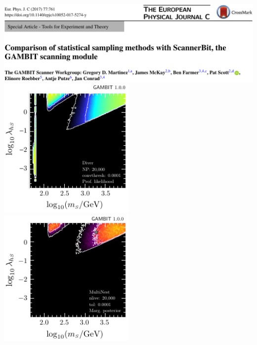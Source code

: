 \documentclass[aspectratio=169]{beamer}
\begin{document}
\begin{frame}[fragile]
\begin{columns}
        \includegraphics[width=\textwidth]{figures/scannerbit_header}
        \includegraphics[width=0.5\textwidth]{figures/scannerbit_15d_diver_profile}%
        \includegraphics[width=0.5\textwidth]{figures/scannerbit_15d_mn_posterior}
    \end{columns}
\end{frame}
\end{document}
